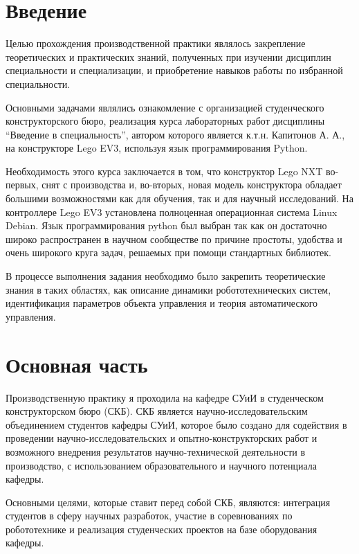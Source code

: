 \documentclass[a4paper,14pt]{extreport}
\begin{document}
	
	\section*{Введение}
	
	Целью прохождения производственной практики являлось закрепление теоретических и практических знаний, полученных при изучении дисциплин специальности и специализации, и приобретение навыков работы по избранной специальности. 
	
	Основными задачами являлись ознакомление с организацией студенческого конструкторского бюро, реализация курса лабораторных работ дисциплины “Введение в специальность”, автором которого является к.т.н. Капитонов А. А., на конструкторе Lego EV3, используя язык программирования Python.
	
	Необходимость этого курса заключается в том, что конструктор Lego NXT во-первых, снят с производства и, во-вторых, новая модель конструктора обладает большими возможностями как для обучения, так и для научный исследований. На контроллере Lego EV3 установлена полноценная операционная система Linux Debian.
	Язык программирования python был выбран так как он достаточно широко распространен в научном сообществе по причине простоты, удобства и очень широкого круга задач, решаемых при помощи стандартных библиотек.
	
	В процессе выполнения задания необходимо было закрепить теоретические знания в таких областях, как описание динамики робототехнических систем, идентификация параметров объекта управления и теория автоматического управления. 
	
	\newpage
	\section*{Основная часть}
	
	Производственную практику я проходила на кафедре СУиИ в студенческом конструкторском бюро (СКБ). СКБ является научно-исследовательским объединением студентов кафедры СУиИ, которое было создано для содействия в проведении научно-исследовательских и опытно-конструкторских работ и возможного внедрения результатов научно-технической деятельности в производство, с использованием образовательного и научного потенциала кафедры.
	
	Основными целями, которые ставит перед собой СКБ, являются: интеграция студентов в сферу научных разработок, участие в соревнованиях по робототехнике и реализация студенческих проектов на базе оборудования кафедры.
	
\end{document}
